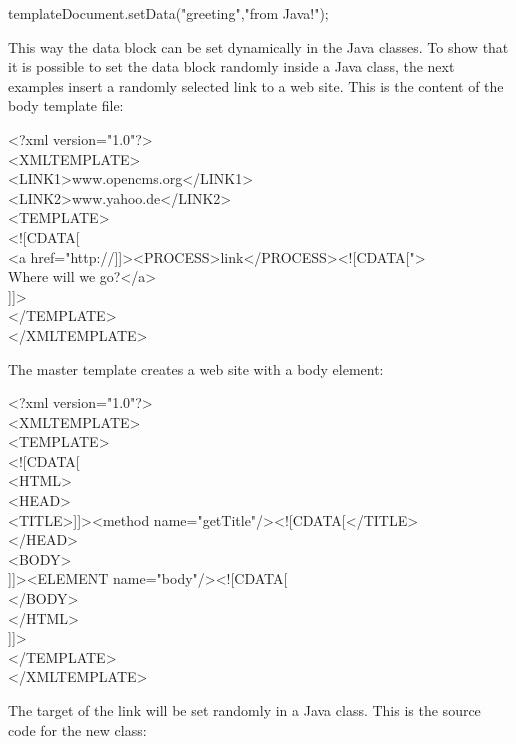 {\meth templateDocument.setData("greeting","from Java!");}

This way the data block can be set dynamically in the Java classes. To
show that it is possible to set the data block randomly inside a Java
class, the next examples insert a randomly selected link to a web site.
This is the content of the body template file:

\begin{xml}
<?xml version="1.0"?>\\
<XMLTEMPLATE>\\
<LINK1>www.opencms.org</LINK1>\\
<LINK2>www.yahoo.de</LINK2>\\
<TEMPLATE>\\
<![CDATA[\\
<a href="http://]]><PROCESS>link</PROCESS><![CDATA[">\\
Where will we go?</a>\\
]]>\\
</TEMPLATE>\\
</XMLTEMPLATE>\\
\end{xml}

The master template creates a web site with a {\name body} element:

\begin{xml}
<?xml version="1.0"?>\\
<XMLTEMPLATE>\\
<TEMPLATE>\\
\xtaba <![CDATA[\\
\xtaba <HTML>\\
\xtaba <HEAD>\\
\xtaba <TITLE>]]><method name="getTitle"/><![CDATA[</TITLE>\\
\xtaba </HEAD>\\
<BODY>\\
\xtaba ]]><ELEMENT name="body"/><![CDATA[\\
\xtaba </BODY>\\
\xtaba </HTML>\\
\xtaba ]]>\\
</TEMPLATE>\\
</XMLTEMPLATE>\\
\end{xml}

The target of the link will be set randomly in a Java class.
This is the source code for the new class:

